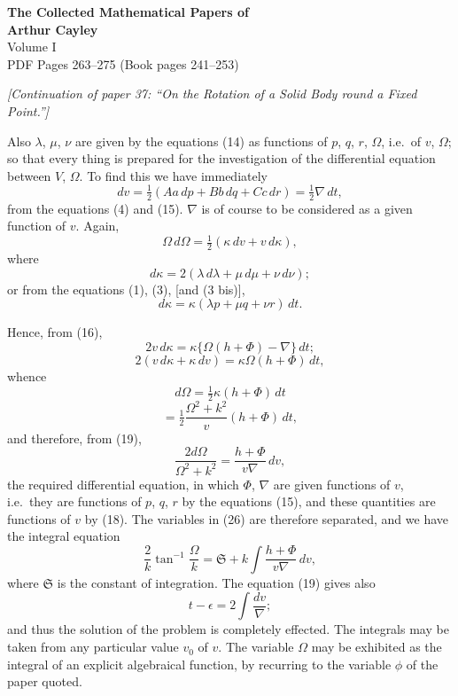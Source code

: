 \documentclass[11pt]{article}
\begin{document}
\begin{center}
{\LARGE\bfseries The Collected Mathematical Papers of}\\[0.5em]
{\LARGE\bfseries Arthur Cayley}\\[1em]
{\Large Volume I}\\[1em]
{\large PDF Pages 263--275 \quad (Book pages 241--253)}\\[2em]
\end{center}

\tableofcontents
\newpage

\setcounter{page}{241}

\noindent\textit{[Continuation of paper 37: ``On the Rotation of a Solid Body round a Fixed Point.'']}

\bigskip

Also $\lambda$, $\mu$, $\nu$ are given by the equations (14) as functions of $p$, $q$, $r$, $\Omega$, i.e.\ of $v$, $\Omega$; so that every thing is prepared for the investigation of the differential equation between $V$, $\Omega$. To find this we have immediately
\[
dv = \tfrac{1}{2}(A a\,dp + B b\,dq + C c\,dr) = \tfrac{1}{2}\nabla\,dt \tag{19},
\]
from the equations (4) and (15). $\nabla$ is of course to be considered as a given function of $v$. Again,
\[
\Omega\,d\Omega = \tfrac{1}{2}(\kappa\,dv + v\,d\kappa) \tag{20},
\]
where
\[
d\kappa = 2(\lambda\,d\lambda + \mu\,d\mu + \nu\,d\nu) \tag{21};
\]
or from the equations (1), (3), [and (3 bis)],
\[
d\kappa = \kappa(\lambda p + \mu q + \nu r)\,dt \tag{22}.
\]

Hence, from (16),
\[
2v\,d\kappa = \kappa\{\Omega(h + \Phi) - \nabla\}\,dt \tag{23};
\]
\[
2(v\,d\kappa + \kappa\,dv) = \kappa\Omega(h + \Phi)\,dt \tag{24},
\]
whence
\[
d\Omega = \tfrac{1}{2}\kappa(h + \Phi)\,dt
\]
\[
= \tfrac{1}{2}\frac{\Omega^2 + k^2}{v}(h + \Phi)\,dt \tag{25},
\]
and therefore, from (19),
\[
\frac{2d\Omega}{\Omega^2 + k^2} = \frac{h + \Phi}{v\nabla}\,dv \tag{26},
\]
the required differential equation, in which $\Phi$, $\nabla$ are given functions of $v$, i.e.\ they are functions of $p$, $q$, $r$ by the equations (15), and these quantities are functions of $v$ by (18). The variables in (26) are therefore separated, and we have the integral equation
\[
\frac{2}{k}\tan^{-1}\!\frac{\Omega}{k} = \mathfrak{S} + k\!\int\!\frac{h + \Phi}{v\nabla}\,dv \tag{27},
\]
where $\mathfrak{S}$ is the constant of integration. The equation (19) gives also
\[
t - \epsilon = 2\!\int\!\frac{dv}{\nabla} \tag{28};
\]
and thus the solution of the problem is completely effected. The integrals may be taken from any particular value $v_0$ of $v$. The variable $\Omega$ may be exhibited as the integral of an explicit algebraical function, by recurring to the variable $\phi$ of the paper quoted.
\end{document}
